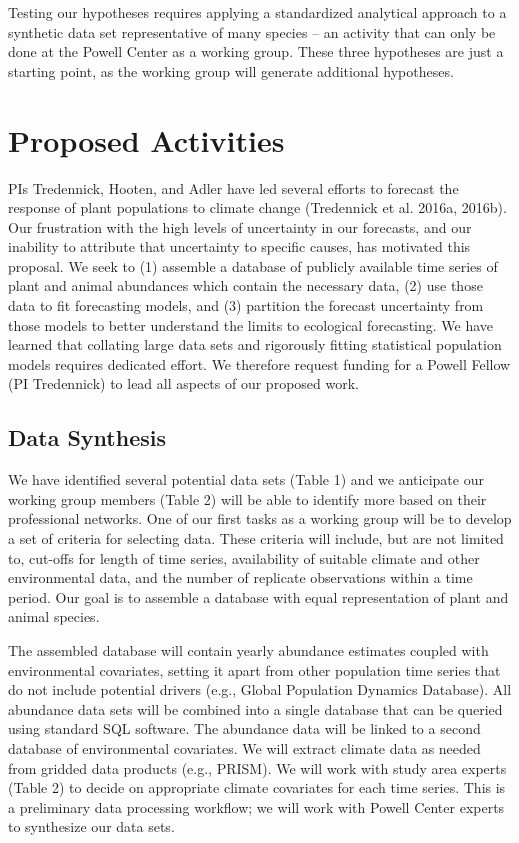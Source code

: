 \documentclass[12pt,]{article}
\begin{document}
Testing our hypotheses requires applying a standardized analytical approach to
a synthetic data set representative of many species -- an activity that can only
be done at the Powell Center as a working group.
These three hypotheses are just a starting point,
as the working group will generate additional hypotheses.

\section{Proposed Activities}

PIs Tredennick, Hooten, and Adler have led several efforts to forecast
the response of plant populations to climate change (Tredennick et al.
2016a, 2016b). Our frustration with the high levels of uncertainty in
our forecasts, and our inability to attribute that uncertainty to
specific causes, has motivated this proposal. We seek to (1) assemble a
database of publicly available time series of plant and animal
abundances which contain the necessary data, (2) use those data to fit
forecasting models, and (3) partition the forecast uncertainty from
those models to better understand the limits to ecological forecasting.
We have learned that collating large data sets and rigorously fitting
statistical population models requires dedicated effort. We therefore
request funding for a Powell Fellow (PI Tredennick) to lead all aspects
of our proposed work.

\subsection{Data Synthesis}
We have identified several potential data
sets (Table 1) and we anticipate our working group members (Table 2)
will be able to identify more based on their professional networks. One of our first tasks as a working group will be to develop
a set of criteria for selecting data. These criteria will include, but
are not limited to, cut-offs for length of time series, availability of suitable climate and other
environmental data, and the number of replicate observations within a
time period. Our goal is to assemble a database with equal
representation of plant and animal species.

The assembled database will contain yearly abundance estimates coupled
with environmental covariates, setting it apart from other population
time series that do not include potential drivers (e.g., Global
Population Dynamics Database). 
 All abundance data sets will
be combined into a single database that can be queried using standard
SQL software. The abundance data will be linked to a
second database of environmental
covariates. We will extract climate
data as needed from gridded data products (e.g., PRISM). We will work with study
area experts (Table 2) to decide on
appropriate climate covariates for each time series. This is
a preliminary data processing workflow; we will work with Powell Center experts to synthesize our data sets.
\end{document}
